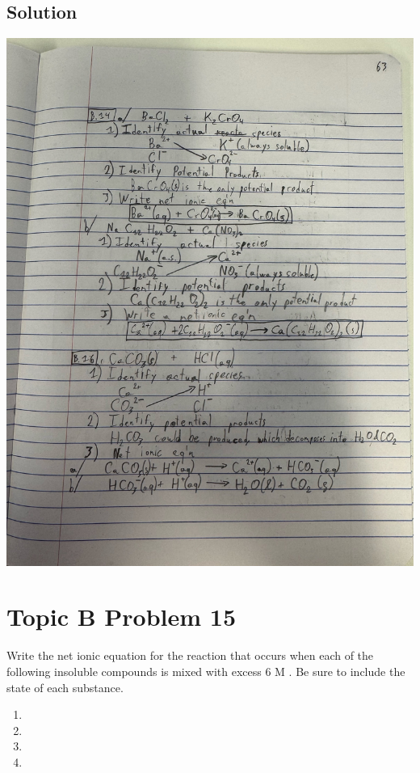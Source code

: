\documentclass[10pt]{article}
\begin{document}
        \subsection{Solution}
            \begin{center}
                \includegraphics[width=\textwidth, trim={5in 23in 3in 7in},clip]{"Answers Images/IMG_6649.jpg"}
            \end{center}

    \pagebreak
    \section{Topic B Problem 15}
        Write the net ionic equation for the reaction that occurs when each of the following insoluble compounds is mixed with excess 6 M . 
        Be sure to include the state of each substance.
        \begin{multicols}{4}
            \begin{enumerate}[label=\alph*)]
                \item {}
                \item {}
                \item {}
                \item {}
            \end{enumerate}
        \end{multicols}
\end{document}
